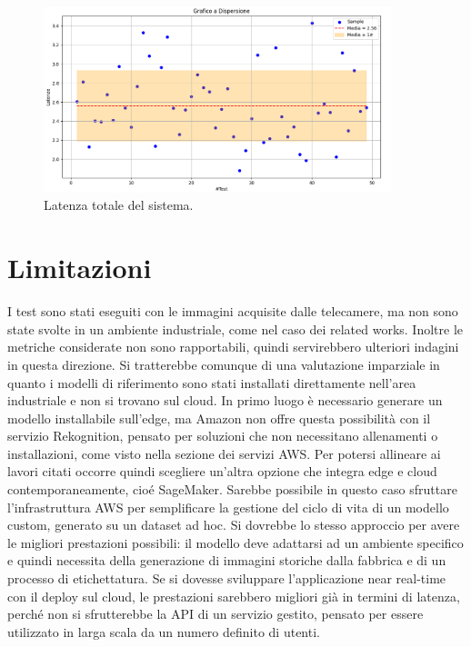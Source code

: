 \begin{figure}[htbp]
    \centering
    \includegraphics[width=0.9\textwidth]{figures/system-latency.png}
    \caption{Latenza totale del sistema.} 
    \label{fig:system-latency}
\end{figure}

\section{Limitazioni}











I test sono stati eseguiti con le immagini acquisite dalle telecamere, ma non sono state svolte in un ambiente industriale, come nel caso dei related works. Inoltre le metriche considerate non sono rapportabili, quindi servirebbero ulteriori indagini in questa direzione. Si tratterebbe comunque di una valutazione imparziale in quanto i modelli di riferimento sono stati installati direttamente nell'area industriale e non si trovano sul cloud. In primo luogo è necessario generare un modello installabile sull'edge, ma Amazon non offre questa possibilità con il servizio Rekognition, pensato per soluzioni che non necessitano allenamenti o installazioni, come visto nella sezione dei servizi AWS. Per potersi allineare ai lavori citati occorre quindi scegliere un'altra opzione che integra edge e cloud contemporaneamente, cioé SageMaker. Sarebbe possibile in questo caso sfruttare l'infrastruttura AWS per semplificare la gestione del ciclo di vita di un modello custom, generato su un dataset ad hoc. Si dovrebbe  lo stesso approccio per avere le migliori prestazioni possibili: il modello deve adattarsi ad un ambiente specifico e quindi necessita della generazione di immagini storiche dalla fabbrica e di un processo di etichettatura. Se si dovesse sviluppare l'applicazione near real-time con il deploy sul cloud, le prestazioni sarebbero migliori già in termini di latenza, perché non si sfrutterebbe la API di un servizio gestito, pensato per essere utilizzato in larga scala da un numero definito di utenti.     

